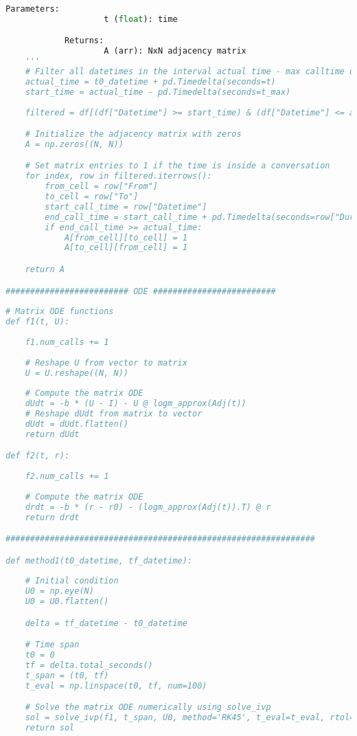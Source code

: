 \begin{lstlisting}[language=Python, caption=$\mathbf{b}(t)$ vs. $\mathbf{r}(t)$ cost comparison]
            Parameters:
                    t (float): time

            Returns:
                    A (arr): NxN adjacency matrix
    '''
    # Filter all datetimes in the interval actual time - max calltime duration
    actual_time = t0_datetime + pd.Timedelta(seconds=t)
    start_time = actual_time - pd.Timedelta(seconds=t_max)
    
    filtered = df[(df["Datetime"] >= start_time) & (df["Datetime"] <= actual_time)]

    # Initialize the adjacency matrix with zeros
    A = np.zeros((N, N))

    # Set matrix entries to 1 if the time is inside a conversation
    for index, row in filtered.iterrows():
        from_cell = row["From"]
        to_cell = row["To"]
        start_call_time = row["Datetime"]
        end_call_time = start_call_time + pd.Timedelta(seconds=row["Duration(seconds)"])
        if end_call_time >= actual_time:
            A[from_cell][to_cell] = 1
            A[to_cell][from_cell] = 1

    return A

######################### ODE #########################
    
# Matrix ODE functions
def f1(t, U):
    
    f1.num_calls += 1
    
    # Reshape U from vector to matrix
    U = U.reshape((N, N))
    
    # Compute the matrix ODE
    dUdt = -b * (U - I) - U @ logm_approx(Adj(t))
    # Reshape dUdt from matrix to vector
    dUdt = dUdt.flatten()
    return dUdt

def f2(t, r):
    
    f2.num_calls += 1
    
    # Compute the matrix ODE
    drdt = -b * (r - r0) - (logm_approx(Adj(t)).T) @ r
    return drdt

###############################################################

def method1(t0_datetime, tf_datetime):
    
    # Initial condition 
    U0 = np.eye(N)
    U0 = U0.flatten()

    delta = tf_datetime - t0_datetime

    # Time span
    t0 = 0
    tf = delta.total_seconds() 
    t_span = (t0, tf) 
    t_eval = np.linspace(t0, tf, num=100)

    # Solve the matrix ODE numerically using solve_ivp
    sol = solve_ivp(f1, t_span, U0, method='RK45', t_eval=t_eval, rtol=1e-4, atol=1e-4)
    return sol



\end{lstlisting}
